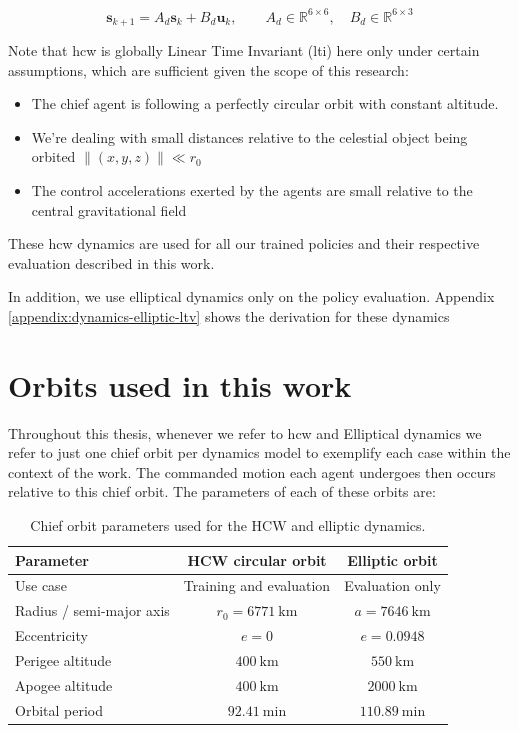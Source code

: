 \[
\mathbf{s}_{k+1} = A_d\mathbf{s}_k + B_d\mathbf{u}_k,
\qquad
A_d \in \mathbb{R}^{6\times 6},
\quad
B_d \in \mathbb{R}^{6\times 3}
\]


Note that \acs{hcw} is globally Linear Time Invariant (\acs{lti}) here only under certain assumptions, which are sufficient given the scope of this research: 

\begin{itemize}
    \item The chief agent is following a perfectly circular orbit with constant altitude. 
    \item We're dealing with small distances relative to the celestial object being orbited $\| (x,y,z)\| \ll r_0$
    \item The control accelerations exerted by the agents are small relative to the central gravitational field
\end{itemize}

These \acs{hcw} dynamics are used for all our trained policies and their respective evaluation described in this work.

In addition, we use elliptical dynamics only on the policy evaluation. Appendix \ref{appendix:dynamics-elliptic-ltv} shows the derivation for these dynamics

\section{Orbits used in this work}
\label{subsec:dynamics-orbits-used}

Throughout this thesis, whenever we refer to \acs{hcw} and Elliptical dynamics we refer to just one chief orbit per dynamics model to exemplify each case within the context of the work. The commanded motion each agent undergoes then occurs relative to this chief orbit. The parameters of each of these orbits are:

\begin{table}[H]
\centering
\caption{Chief orbit parameters used for the HCW and elliptic dynamics.}
\label{tab:chief-orbit-parameters}
\begin{tabular}{lcc}
\toprule
\textbf{Parameter} & \textbf{HCW circular orbit} & \textbf{Elliptic orbit} \\
\midrule
Use case & Training and evaluation & Evaluation only \\
Radius / semi-major axis & $r_0 = 6771~\mathrm{km}$ & $a = 7646~\mathrm{km}$ \\
Eccentricity & $e = 0$ & $e = 0.0948$ \\
Perigee altitude & $400~\mathrm{km}$ & $550~\mathrm{km}$ \\
Apogee altitude & $400~\mathrm{km}$ & $2000~\mathrm{km}$ \\
Orbital period & $92.41~\mathrm{min}$ & $110.89~\mathrm{min}$ \\
\bottomrule
\end{tabular}
\end{table}


